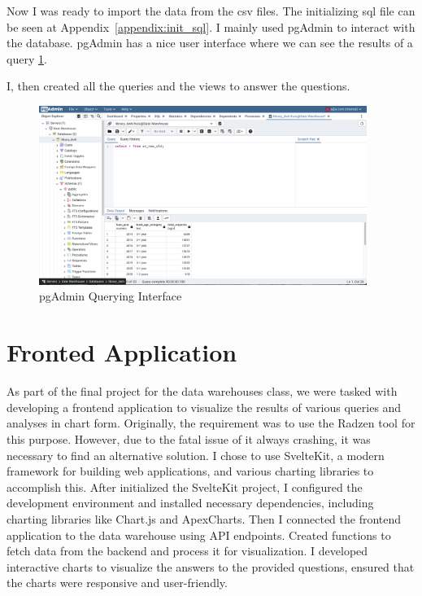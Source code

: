 \documentclass[12pt]{report}
\begin{document}
Now I was ready to import the data from the csv files. The initializing sql file can be seen at Appendix~\ref{appendix:init_sql}.
I mainly used pgAdmin to interact with the database. pgAdmin has a nice user interface where we can see the results of a query \ref{fig:pg_admin_query}.

I, then created all the queries and the views to answer the questions.

\begin{figure}
    \begin{center}
        \includegraphics[width=0.95\textwidth]{figures/pg_admin_query.png}
    \end{center}
    \caption{pgAdmin Querying Interface}\label{fig:pg_admin_query}
\end{figure}


\section{Fronted Application}

As part of the final project for the data warehouses class, we were tasked with developing a frontend application to visualize the results of various queries and analyses in chart form. Originally, the requirement was to use the Radzen tool for this purpose. However, due to the fatal issue of it always crashing, it was necessary to find an alternative solution. I chose to use SvelteKit, a modern framework for building web applications, and various charting libraries to accomplish this.
After initialized the SvelteKit project, I configured the development environment and installed necessary dependencies, including charting libraries like Chart.js and ApexCharts.
Then I connected the frontend application to the data warehouse using API endpoints. Created functions to fetch data from the backend and process it for visualization.
I developed interactive charts to visualize the answers to the provided questions, ensured that the charts were responsive and user-friendly.
\end{document}
